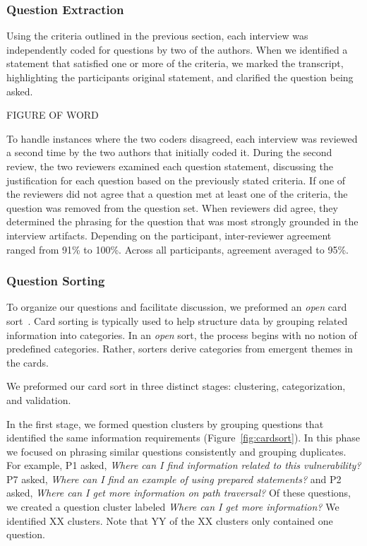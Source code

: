 \documentclass[conference]{IEEEtran}
\begin{document}
\subsubsection{Question Extraction}
Using the criteria outlined in the previous section, each interview was independently coded for questions by two of the authors. 
When we identified a statement that satisfied one or more of the criteria, we marked the transcript, highlighting the participants original statement, and clarified the question being asked.

FIGURE OF WORD


To handle instances where the two coders disagreed, each interview was reviewed a second time by the two authors that initially coded it.
During the second review, the two reviewers examined each question statement, discussing the justification for each question based on the previously stated criteria.
If one of the reviewers did not agree that a question met at least one of the criteria, the question was removed from the question set. 
When reviewers did agree, they determined the phrasing for the question that was most strongly grounded in the interview artifacts. 
Depending on the participant, inter-reviewer agreement ranged from 91\% to 100\%. Across all participants, agreement averaged to 95\%.

\subsubsection{Question Sorting}
To organize our questions and facilitate discussion, we preformed an \textit{open} card sort~\cite{hudson2013sorting}. 
Card sorting is typically used to help structure data by grouping related information into categories. 
In an \textit{open} sort, the process begins with no notion of predefined categories. 
Rather, sorters derive categories from emergent themes in the cards. 

\label{fig:cardsort} 

We preformed our card sort in three distinct stages: clustering, categorization, and validation.
 
In the first stage, we formed question clusters by grouping questions that identified the same information requirements (Figure~\ref{fig:cardsort}). 
In this phase we focused on phrasing similar questions consistently and grouping duplicates.
For example, P1 asked, \textit{Where can I find information related to this vulnerability?} P7 asked, \textit{Where can I find an example of using prepared statements?} and P2 asked, \textit{Where can I get more information on path traversal?} 
Of these questions, we created a question cluster labeled \textit{Where can I get more information?}
We identified XX clusters. Note that YY of the XX clusters only contained one question.
\end{document}
